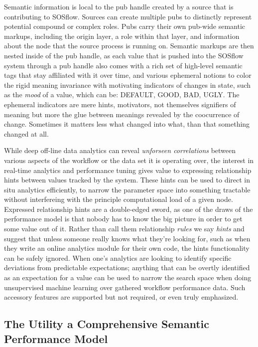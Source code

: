 Semantic information is local to the pub handle created by a source
that is contributing to SOSflow.
%
Sources can create multiple pubs to distinctly represent potential
compound or complex roles.
%
Pubs carry their own pub-wide semantic markups, including the origin
layer, a role within that layer, and information about the node that
the source process is running on.
%
Semantic markups are then nested inside of the pub handle, as each
value that is pushed into the SOSflow system through a pub handle also
comes with a rich set of high-level semantic tags that stay affiliated
with it over time, and various ephemeral notions to color the rigid
meaning invariance with motivating indicators of changes in state,
such as the \textit{mood} of a value, which can be: DEFAULT, GOOD,
BAD, UGLY.
%
The ephemeral indicators are mere hints, motivators, not themselves
signifiers of meaning but more the glue between meanings revealed by
the coocurrence of change.
%
Sometimes it matters less what changed into what, than that something
changed at all.

While deep off-line data analytics can reveal \textit{unforseen
  correlations} between various aspects of the workflow or the data
set it is operating over, the interest in real-time analytics and
performance tuning gives value to expressing relationship hints
between values tracked by the system.
%
These hints can be used to direct in situ analytics efficiently, to
narrow the parameter space into something tractable without
interfereing with the principle computational load of a given
node.
%
Expressed relationship hints are a double-edged sword, as one of the
draws of the performance model is that nobody has to know the big
picture in order to get some value out of it.
%
Rather than call them relationship \textit{rules} we say
\textit{hints} and suggest that unless someone really knows what
they're looking for, such as when they write an online analytics
module for their own code, the hints functionality can be safely
ignored.
%
When one's analytics are looking to identify specific deviations from
predictable expectations; anything that can be overtly identified as
an expectation for a value can be used to narrow the search space when
doing unsupervised machine learning over gathered workflow performance
data.
%
Such accessory features are supported but not required, or even truly
emphasized.


\subsection{The Utility a Comprehensive Semantic Performance Model}

